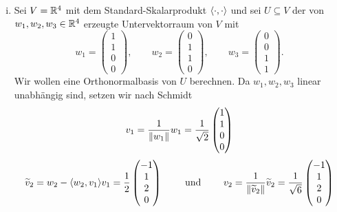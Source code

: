 \begin{beispiel}
\begin{enumerate}[(i)]
\begin{figure}[h]
		\end{figure}
		\newpage
		\item Sei $V = \mathbb{R}^4$ mit dem Standard-Skalarprodukt $\left\langle\cdot,\cdot\right\rangle$ und sei $U \subseteq V$ der von $w_1,w_2,w_3 \in \mathbb{R}^4$ erzeugte Untervektorraum von $V$ mit
		\[
			w_1 = \begin{pmatrix} 1 \\ 1 \\ 0 \\ 0 \end{pmatrix}, \qquad
			w_2 = \begin{pmatrix} 0 \\ 1 \\ 1 \\ 0 \end{pmatrix}, \qquad 
			w_3 = \begin{pmatrix} 0 \\ 0 \\ 1 \\ 1 \end{pmatrix}.
		\]
		Wir wollen eine Orthonormalbasis von $U$ berechnen.
		Da $w_1,w_2,w_3$ linear unabhängig sind, setzen wir nach Schmidt
		\[
			v_1 = \frac{1}{\left\lVert w_1\right\rVert} w_1 = \frac{1}{\sqrt{2}} \begin{pmatrix} 1 \\ 1 \\ 0 \\ 0 \end{pmatrix}
		\]
		\[
			\widetilde{v}_2 = w_2 - \sk{w_2,v_1} v_1 = \frac{1}{2} \begin{pmatrix} -1 \\ 1 \\ 2 \\ 0 \end{pmatrix} \qquad \text{ und } \qquad 
			v_2 = \frac{1}{\no{\widetilde{v}_2}} \widetilde{v}_2 = \frac{1}{\sqrt{6}} \begin{pmatrix} -1 \\ 1 \\ 2 \\ 0 \end{pmatrix}
\]
\end{enumerate}
\end{beispiel}
